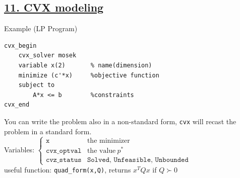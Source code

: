 \documentclass[a4paper]{article}
\begin{document}
\subsection*{\underline{11. CVX modeling}}
\begin{multicols}{2}
    \noindent
Example (LP Program)
\begin{verbatim}
cvx_begin
    cvx_solver mosek        
    variable x(2)       % name(dimension)
    minimize (c'*x)     %objective function
    subject to             
        A*x <= b        %constraints
cvx_end 
\end{verbatim}
    \newcolumn
    You can write the problem also in a non-standard form, \texttt{cvx} will recast the problem in a standard form. \\
    Variables: $\begin{cases}
        \texttt{x}&\text{the minimizer}\\
        \texttt{cvx\_optval}&\text{the value} \ p^*\\
        \texttt{cvz\_status}&\texttt{Solved, Unfeasible, Unbounded}
    \end{cases}$\\

    \noindent
    useful function: \texttt{quad\_form(x,Q)}, returns $x^T{Q}x$ if $Q\succ0$
\end{multicols}
\end{document}
